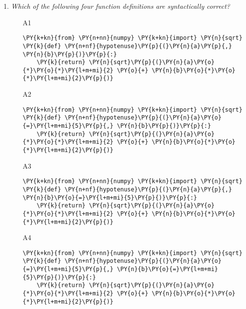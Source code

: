 \begin{enumerate}
\vspace{6mm}

\item {\em Which of the following four function definitions are syntactically correct?}\\

\begin{enumerate}
\item[A1] 
\begin{Verbatim}[commandchars=\\\{\}]
\PY{k+kn}{from} \PY{n+nn}{numpy} \PY{k+kn}{import} \PY{n}{sqrt}
\PY{k}{def} \PY{n+nf}{hypotenuse}\PY{p}{(}\PY{n}{a}\PY{p}{,} \PY{n}{b}\PY{p}{)}\PY{p}{:}
    \PY{k}{return} \PY{n}{sqrt}\PY{p}{(}\PY{n}{a}\PY{o}{*}\PY{o}{*}\PY{l+m+mi}{2} \PY{o}{+} \PY{n}{b}\PY{o}{*}\PY{o}{*}\PY{l+m+mi}{2}\PY{p}{)}
\end{Verbatim}
\item[A2] 
\begin{Verbatim}[commandchars=\\\{\}]
\PY{k+kn}{from} \PY{n+nn}{numpy} \PY{k+kn}{import} \PY{n}{sqrt}
\PY{k}{def} \PY{n+nf}{hypotenuse}\PY{p}{(}\PY{n}{a}\PY{o}{=}\PY{l+m+mi}{5}\PY{p}{,} \PY{n}{b}\PY{p}{)}\PY{p}{:}
    \PY{k}{return} \PY{n}{sqrt}\PY{p}{(}\PY{n}{a}\PY{o}{*}\PY{o}{*}\PY{l+m+mi}{2} \PY{o}{+} \PY{n}{b}\PY{o}{*}\PY{o}{*}\PY{l+m+mi}{2}\PY{p}{)}
\end{Verbatim}
\item[A3] 
\begin{Verbatim}[commandchars=\\\{\}]
\PY{k+kn}{from} \PY{n+nn}{numpy} \PY{k+kn}{import} \PY{n}{sqrt}
\PY{k}{def} \PY{n+nf}{hypotenuse}\PY{p}{(}\PY{n}{a}\PY{p}{,} \PY{n}{b}\PY{o}{=}\PY{l+m+mi}{5}\PY{p}{)}\PY{p}{:}
    \PY{k}{return} \PY{n}{sqrt}\PY{p}{(}\PY{n}{a}\PY{o}{*}\PY{o}{*}\PY{l+m+mi}{2} \PY{o}{+} \PY{n}{b}\PY{o}{*}\PY{o}{*}\PY{l+m+mi}{2}\PY{p}{)}
\end{Verbatim}
\item[A4] 
\begin{Verbatim}[commandchars=\\\{\}]
\PY{k+kn}{from} \PY{n+nn}{numpy} \PY{k+kn}{import} \PY{n}{sqrt}
\PY{k}{def} \PY{n+nf}{hypotenuse}\PY{p}{(}\PY{n}{a}\PY{o}{=}\PY{l+m+mi}{5}\PY{p}{,} \PY{n}{b}\PY{o}{=}\PY{l+m+mi}{5}\PY{p}{)}\PY{p}{:}
    \PY{k}{return} \PY{n}{sqrt}\PY{p}{(}\PY{n}{a}\PY{o}{*}\PY{o}{*}\PY{l+m+mi}{2} \PY{o}{+} \PY{n}{b}\PY{o}{*}\PY{o}{*}\PY{l+m+mi}{2}\PY{p}{)}
\end{Verbatim}
\end{enumerate}


\end{enumerate}

